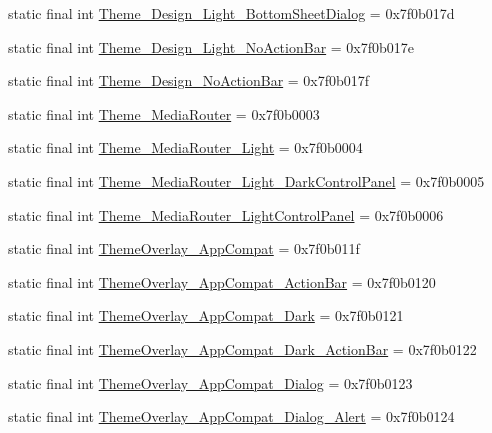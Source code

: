\begin{CompactItemize}
\item 
static final int \hyperlink{classandroid_1_1support_1_1v4_1_1_r_1_1style_d5166b3e6b40bd4f40a326ad6ccc4750}{Theme\_\-Design\_\-Light\_\-BottomSheetDialog} = 0x7f0b017d
\item 
static final int \hyperlink{classandroid_1_1support_1_1v4_1_1_r_1_1style_9c0933f9ed1a51b76af96930fac3eef7}{Theme\_\-Design\_\-Light\_\-NoActionBar} = 0x7f0b017e
\item 
static final int \hyperlink{classandroid_1_1support_1_1v4_1_1_r_1_1style_e827b694d67f7de422fbb6222f84d808}{Theme\_\-Design\_\-NoActionBar} = 0x7f0b017f
\item 
static final int \hyperlink{classandroid_1_1support_1_1v4_1_1_r_1_1style_04ef8f081e632316cd31a54b359e4fb3}{Theme\_\-MediaRouter} = 0x7f0b0003
\item 
static final int \hyperlink{classandroid_1_1support_1_1v4_1_1_r_1_1style_0c8d2b33bee073a704ed24a35ba84047}{Theme\_\-MediaRouter\_\-Light} = 0x7f0b0004
\item 
static final int \hyperlink{classandroid_1_1support_1_1v4_1_1_r_1_1style_46564596d5a38ec0ac20f819f7d23bdb}{Theme\_\-MediaRouter\_\-Light\_\-DarkControlPanel} = 0x7f0b0005
\item 
static final int \hyperlink{classandroid_1_1support_1_1v4_1_1_r_1_1style_e02b164abb33db9b94b832edec6f7d38}{Theme\_\-MediaRouter\_\-LightControlPanel} = 0x7f0b0006
\item 
static final int \hyperlink{classandroid_1_1support_1_1v4_1_1_r_1_1style_31d4a1396eca67790c17863f34935248}{ThemeOverlay\_\-AppCompat} = 0x7f0b011f
\item 
static final int \hyperlink{classandroid_1_1support_1_1v4_1_1_r_1_1style_8fd21a52f17b7501c0640391d62050bb}{ThemeOverlay\_\-AppCompat\_\-ActionBar} = 0x7f0b0120
\item 
static final int \hyperlink{classandroid_1_1support_1_1v4_1_1_r_1_1style_7ab35ee9b11b056de9cdd90c719533b0}{ThemeOverlay\_\-AppCompat\_\-Dark} = 0x7f0b0121
\item 
static final int \hyperlink{classandroid_1_1support_1_1v4_1_1_r_1_1style_1680e3af099d01795c6506d92e5e6d47}{ThemeOverlay\_\-AppCompat\_\-Dark\_\-ActionBar} = 0x7f0b0122
\item 
static final int \hyperlink{classandroid_1_1support_1_1v4_1_1_r_1_1style_100ce85652c7afb97bf9c2e51adfb9b3}{ThemeOverlay\_\-AppCompat\_\-Dialog} = 0x7f0b0123
\item 
static final int \hyperlink{classandroid_1_1support_1_1v4_1_1_r_1_1style_8d92742bb066ed68dcb12d6a9e93f94d}{ThemeOverlay\_\-AppCompat\_\-Dialog\_\-Alert} = 0x7f0b0124

\end{CompactItemize}
